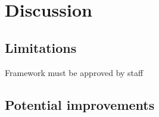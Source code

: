 \chapter{Discussion}
\label{cha:discussion}

\section{Limitations}
Framework must be approved by staff

\section{Potential improvements}







